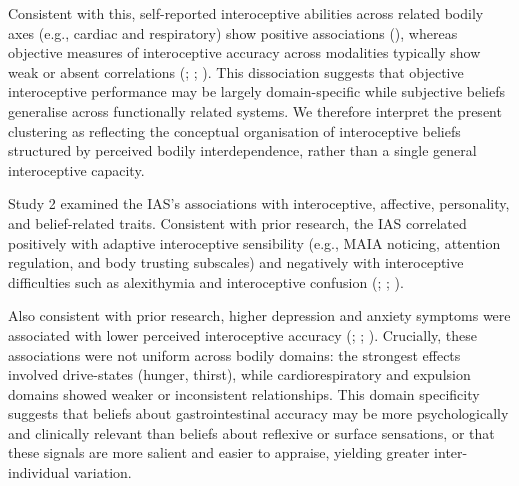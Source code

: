 \documentclass[
  jou,
  floatsintext,
  longtable,
  nolmodern,
  notxfonts,
  notimes,
  colorlinks=true,linkcolor=blue,citecolor=blue,urlcolor=blue]{apa7}
\begin{document}
Consistent with this, self-reported interoceptive abilities across
related bodily axes (e.g., cardiac and respiratory) show positive
associations (), whereas objective measures of interoceptive accuracy across
modalities typically show weak or absent correlations
(;
;
). This
dissociation suggests that objective interoceptive performance may be
largely domain-specific while subjective beliefs generalise across
functionally related systems. We therefore interpret the present
clustering as reflecting the conceptual organisation of interoceptive
beliefs structured by perceived bodily interdependence, rather than a
single general interoceptive capacity.

Study 2 examined the IAS's associations with interoceptive, affective,
personality, and belief-related traits. Consistent with prior research,
the IAS correlated positively with adaptive interoceptive sensibility
(e.g., MAIA noticing, attention regulation, and body trusting subscales)
and negatively with interoceptive difficulties such as alexithymia and
interoceptive confusion (;
;
).

Also consistent with prior research, higher depression and anxiety
symptoms were associated with lower perceived interoceptive accuracy
(;
; ).
Crucially, these associations were not uniform across bodily domains:
the strongest effects involved drive-states (hunger, thirst), while
cardiorespiratory and expulsion domains showed weaker or inconsistent
relationships. This domain specificity suggests that beliefs about
gastrointestinal accuracy may be more psychologically and clinically
relevant than beliefs about reflexive or surface sensations, or that
these signals are more salient and easier to appraise, yielding greater
inter-individual variation.
\end{document}
